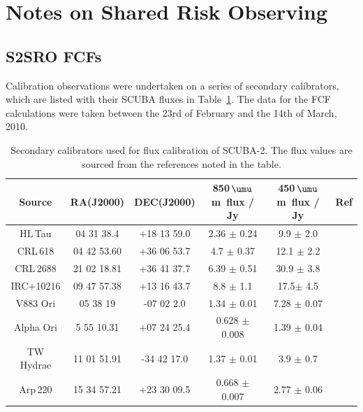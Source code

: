 \documentclass[twoside,11pt]{starlink}
\providecommand{\micron}{\mbox{\,${\umu}$m}}            %
\begin{document}
\section{Notes on Shared Risk Observing}

\subsection{S2SRO FCFs}

Calibration observations were undertaken on a series of secondary
calibrators, which are listed with their SCUBA fluxes in
Table~\ref{tab1}. The data for the FCF calculations were taken between
the 23rd of February and the 14th of March, 2010.

\begin{table}[h]
\caption{Secondary calibrators used for flux calibration of SCUBA-2.
  The flux values are sourced from the references noted in the table. }
\label{tab1}
\begin{center}
\begin{tabular}{|c|c|c|c|c|c|}

\hline
\rule[-1ex]{0pt}{3.5ex} Source & RA(J2000) & DEC(J2000) & 850\micron\
flux / Jy & 450\micron\ flux / Jy & Ref  \\
\hline
\rule[-1ex]{0pt}{3.5ex} HL\,Tau & 04 31 38.4 & +18 13 59.0 & 2.36 $\pm$ 0.24     & 9.9 $\pm$ 2.0 & \cite{flux1}\\
\hline
\rule[-1ex]{0pt}{3.5ex} CRL\,618	& 04 42 53.60 & +36 06 53.7 & 4.7  $\pm$ 0.37   & 12.1 $\pm$ 2.2 & \cite{flux1} \\
\hline
\rule[-1ex]{0pt}{3.5ex} CRL\,2688 & 21 02 18.81 & +36 41 37.7 & 6.39  $\pm$ 0.51  & 30.9 $\pm$ 3.8 & \cite{flux1} \\
\hline
\rule[-1ex]{0pt}{3.5ex} IRC+10216 & 09 47 57.38 & +13 16 43.7 & 8.8  $\pm$ 1.1  & 17.5$\pm$ 4.5 & \cite{flux1} \\
\hline
\rule[-1ex]{0pt}{3.5ex} V883 Ori &  05 38 19  & -07 02 2.0 & 1.34 $\pm$ 0.01     & 7.28 $\pm$ 0.07 & \cite{flux2}   \\
\hline
\rule[-1ex]{0pt}{3.5ex} Alpha Ori & 5 55 10.31 & +07 24 25.4 & 0.628 $\pm$ 0.008  & 1.39 $\pm$ 0.04 & \cite{flux2}  \\
\hline
\rule[-1ex]{0pt}{3.5ex} TW Hydrae & 11 01 51.91 & -34 42 17.0 & 1.37 $\pm$ 0.01 & 3.9 $\pm$ 0.7 & \cite{flux2}  \\
\hline
\rule[-1ex]{0pt}{3.5ex} Arp\,220 & 15 34 57.21 & +23 30 09.5 & 0.668 $\pm$ 0.007  & 2.77 $\pm$ 0.06 & \cite{flux2} \\
\hline

\end{tabular}
\end{center}
\end{table}
\end{document}
